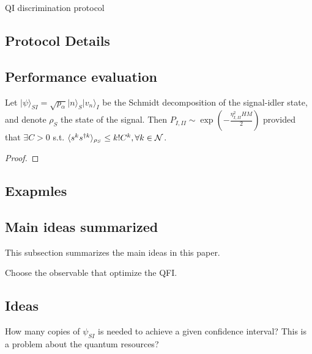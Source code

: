 \documentclass[../../note.tex]{subfiles}
\begin{document}
\begin{algorithm}[H]
    \caption{QI discrimination protocol}
    \label{ptl: quantum illumination discrimination protocol}
\end{algorithm}

\subsection{Protocol Details}


\subsection{Performance evaluation}
\begin{theorem}
    Let $\vert \psi \rangle_{SI} = \sqrt{p_\alpha}\vert n \rangle_S \vert v_n \rangle_I$ be the Schmidt decomposition of the signal-idler state, and denote $\rho_S$ the state of the signal. Then $P_{I, II} \sim \exp\left(-\frac{\eta_{I, II}^2 H M}{2}\right)$ provided that $\exists C >0$ s.t. $\langle s^k s^{\dagger k} \rangle_{\rho_S} \leq k !C^k, \forall k \in \mathcal{N}$.
\end{theorem}
\begin{proof}
    
\end{proof}

\subsection{Exapmles}
\begin{example}
 
\end{example}

\begin{example}
 
\end{example}

\subsection{Main ideas summarized}
This subsection summarizes the main ideas in this paper.

Choose the observable that optimize the QFI.


\subsection{Ideas}
How many copies of $\psi_{SI}$ is needed to achieve a given confidence interval? This is a problem about the quantum resources?





\end{document}
